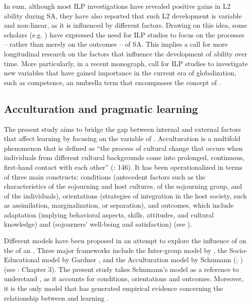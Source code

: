 \documentclass[output=paper]{langsci/langscibook}
\begin{document}
\largerpage
In sum, although most ILP investigations have revealed positive gains in L2  ability during SA, they have also reported that such L2  development is variable and non-linear, as it is influenced by different factors. Drawing on this idea, some scholars (e.g. \citealt{Taguchi2015contextually}) have expressed the need for ILP studies to focus on the processes – rather than merely on the outcomes – of SA. This implies a call for more longitudinal research on the factors that influence the development of  ability over time. More particularly, in a recent monograph, \citet{TaguchiRoever2017} call for ILP studies to investigate new variables that have gained importance in the current era of globalization, such as  competence, an umbrella term that encompasses the concept of .

\subsection{Acculturation and pragmatic learning}\label{sec:sanchez:2.2}

The present study aims to bridge the gap between internal and external factors that affect   learning by focusing on the variable of . {Acculturation} is a multifold phenomenon that is defined as “the process of cultural change that occurs when individuals from different cultural backgrounds come into prolonged, continuous, first-hand contact with each other” (\citealt{RedfieldEtAl1936}: 146). It has been operationalized in terms of three main constructs:  conditions (antecedent factors such as the characteristics of the sojourning and host cultures, of the sojourning group, and of the individuals),  orientations (strategies of integration in the host society, such as assimilation, marginalization, or separation), and  outcomes, which include  adaptation (implying behavioral aspects, skills, attitudes, and cultural knowledge) and  (sojourners’ well-being and satisfaction) (see \citealt{Arends-TóthVanDeVijver2006}). 

Different models have been proposed in an attempt to explore the influence of  on the  of an . Three major frameworks include the Inter-group model by \citet{BeebeGiles1984}, the Socio-Educational model by Gardner \citep{GardnerEtAl1983}, and the Acculturation model by Schumann (\citeyear{Schumann1978}; \citeyear{Schumann1986}) (see \citealt{Ellis1994}: Chapter 3). The present study takes Schumann’s model as a reference to understand , as it accounts for  conditions, orientations and outcomes. Moreover, it is the only model that has generated empirical evidence concerning the relationship between  and  learning \citep{Schmidt1983,DörnyeiEtAl2004,SchmittEtAl2004}.
\end{document}
